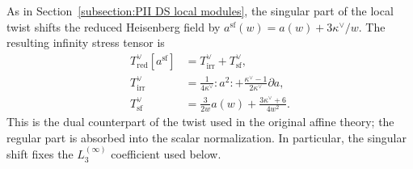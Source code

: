 \documentclass[a4paper,11pt]{article}
\numberwithin{equation}{section}
\begin{document}
As in Section~\ref{subsection:PII DS local modules}, the singular part of the local twist shifts the reduced Heisenberg field by
$a^{\mathrm{sf}}(w)=a(w)+3\kappa^{\vee}/w$.  The resulting infinity stress tensor is
\begin{equation}
	\label{equation:PII dual stress separation}
	\begin{aligned}
		T_{\mathrm{red}}^{\vee}[a^{\mathrm{sf}}]
		&=T_{\mathrm{irr}}^{\vee}+T_{\mathrm{sf}}^{\vee},\\
		T_{\mathrm{irr}}^{\vee}
		&=\frac{1}{4\kappa^{\vee}}:a^{2}:
		+\frac{\kappa^{\vee}-1}{2\kappa^{\vee}}\partial a,\\
		T_{\mathrm{sf}}^{\vee}
		&=\frac{3}{2w}a(w)+\frac{3\kappa^{\vee}+6}{4w^{2}}.
	\end{aligned}
\end{equation}
This is the dual counterpart of the twist used in the original affine theory; the regular part is absorbed into the scalar normalization.  In particular, the singular shift fixes the $L_{3}^{(\infty)}$ coefficient used below.
\end{document}
